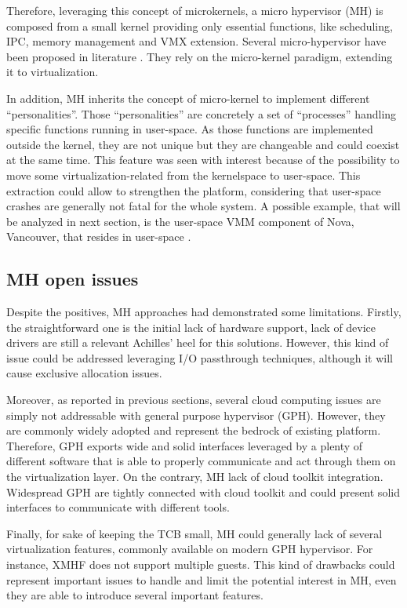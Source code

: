 \documentclass{acm_proc_article-sp} %
\begin{document}
Therefore, leveraging this concept of microkernels, a micro hypervisor (MH) is composed from a small kernel providing only essential functions, like scheduling, IPC, memory management and VMX extension. Several micro-hypervisor have been proposed in literature \cite{xmhf, nova}. They rely on the micro-kernel paradigm, extending it to virtualization. 

In addition, MH inherits the concept of micro-kernel to implement different ``personalities''. Those ``personalities'' are concretely a set of ``processes'' handling specific functions running in user-space. As those functions are implemented outside the kernel, they are not unique but they are changeable and could coexist at the same time. This feature was seen with interest because of the possibility to move some virtualization-related from the kernelspace to user-space. This extraction could allow to strengthen the platform, considering that user-space crashes are generally not fatal for the whole system.  A possible example, that will be analyzed in next section, is the user-space VMM component of Nova, Vancouver, that resides in user-space \cite{nova}.

\subsection {MH open issues}

Despite the positives, MH approaches had demonstrated some limitations. Firstly, the straightforward one is the initial lack of hardware support, lack of device drivers are still a relevant Achilles' heel for this solutions. However, this kind of issue could be addressed leveraging I/O passthrough techniques, although it will cause exclusive allocation issues.

Moreover, as reported in previous sections, several cloud computing issues are simply not addressable with general purpose hypervisor (GPH). However, they are commonly widely adopted and represent the bedrock of existing platform. Therefore, GPH exports wide and solid interfaces leveraged by a plenty of different software that is able to properly communicate and act through them on the virtualization layer. On the contrary, MH lack of cloud toolkit integration. Widespread GPH are tightly connected with cloud toolkit and could present solid interfaces to communicate with different tools. 

Finally, for sake of keeping the TCB small, MH could generally lack of several virtualization features, commonly available on modern GPH hypervisor. For instance, XMHF does not support multiple guests. This kind of drawbacks could represent important issues to handle and limit the potential interest in MH, even they are able to introduce several important features.
\end{document}
